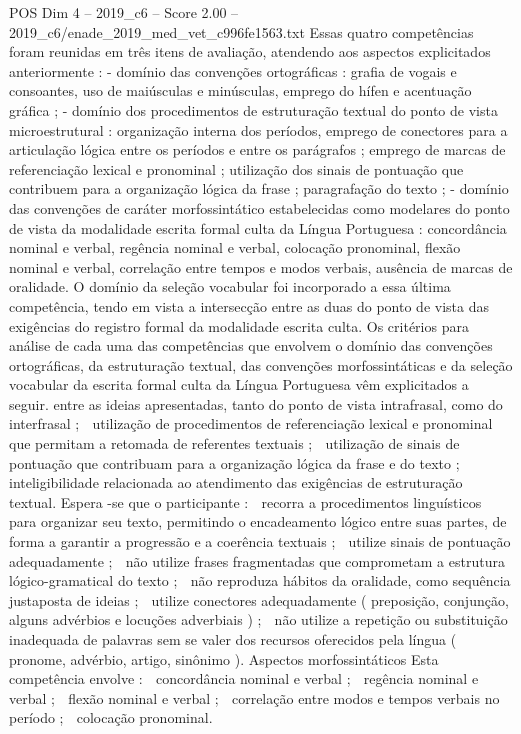 \begin{textsample}{POS Dim 4 – 2019\_c6 – Score 2.00 – 2019\_c6/enade\_2019\_med\_vet\_c996fe1563.txt}
Essas quatro competências foram reunidas em três itens de avaliação, atendendo aos aspectos explicitados anteriormente : - domínio das convenções ortográficas : grafia de vogais e consoantes, uso de maiúsculas e minúsculas, emprego do hífen e acentuação gráfica ; - domínio dos procedimentos de estruturação textual do ponto de vista microestrutural : organização interna dos períodos, emprego de conectores para a articulação lógica entre os períodos e entre os parágrafos ; emprego de marcas de referenciação lexical e pronominal ; utilização dos sinais de pontuação que contribuem para a organização lógica da frase ; paragrafação do texto ; - domínio das convenções de caráter morfossintático estabelecidas como modelares do ponto de vista da modalidade escrita formal culta da Língua Portuguesa : concordância nominal e verbal, regência nominal e verbal, colocação pronominal, flexão nominal e verbal, correlação entre tempos e modos verbais, ausência de marcas de oralidade.
O domínio da seleção vocabular foi incorporado a essa última competência, tendo em vista a intersecção entre as duas do ponto de vista das exigências do registro formal da modalidade escrita culta.
Os critérios para análise de cada uma das competências que envolvem o domínio das convenções ortográficas, da estruturação textual, das convenções morfossintáticas e da seleção vocabular da escrita formal culta da Língua Portuguesa vêm explicitados a seguir. entre as ideias apresentadas, tanto do ponto de vista intrafrasal, como do interfrasal ;  utilização de procedimentos de referenciação lexical e pronominal que permitam a retomada de referentes textuais ;  utilização de sinais de pontuação que contribuam para a organização lógica da frase e do texto ;  inteligibilidade relacionada ao atendimento das exigências de estruturação textual.
Espera -se que o participante :  recorra a procedimentos linguísticos para organizar seu texto, permitindo o encadeamento lógico entre suas partes, de forma a garantir a progressão e a coerência textuais ;  utilize sinais de pontuação adequadamente ;  não utilize frases fragmentadas que comprometam a estrutura lógico-gramatical do texto ;  não reproduza hábitos da oralidade, como sequência justaposta de ideias ;  utilize conectores adequadamente ( preposição, conjunção, alguns advérbios e locuções adverbiais ) ;  não utilize a repetição ou substituição inadequada de palavras sem se valer dos recursos oferecidos pela língua ( pronome, advérbio, artigo, sinônimo ).
Aspectos morfossintáticos Esta competência envolve :  concordância nominal e verbal ;  regência nominal e verbal ;  flexão nominal e verbal ;  correlação entre modos e tempos verbais no período ;  colocação pronominal.

\end{textsample}
